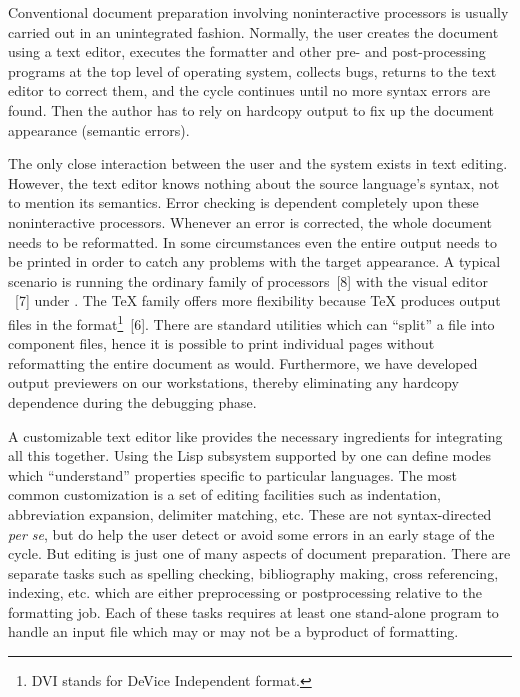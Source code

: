 Conventional document preparation involving noninteractive processors
is usually carried out in an unintegrated fashion.  Normally, the user
creates the document using a text editor, executes the formatter and
other pre- and post-processing programs at the top level of operating system,
collects bugs, returns to the text editor to correct them,
and the cycle continues until no more syntax errors are found.
Then the author has to rely on hardcopy output to fix up the 
document appearance (semantic errors).

The only close interaction between the user and the system exists in
text editing.  However, the text editor knows nothing about the source language's
syntax, not to mention its semantics.  Error checking is dependent completely
upon these noninteractive processors.  Whenever an error is corrected,
the whole document needs to be reformatted.  In some circumstances even 
the entire output needs to be printed in order to catch any problems with the
target appearance.  A typical scenario is running the ordinary {\troff}
family of processors~[8] with the visual editor {\vi}~[7] under {\unix}.
The {\TeX} family offers more flexibility because {\TeX} produces output
files in the {\dvi} format\footnote{DVI stands for
DeVice Independent format.}~[6].
There are standard utilities which can ``split'' a {\dvi} file into component
files, hence it is possible to print individual pages without reformatting
the entire document as {\troff} would.
Furthermore, we have developed
output previewers on our workstations, thereby eliminating any hardcopy
dependence during the debugging phase.

A customizable text editor like {\emacs} provides the necessary
ingredients for integrating all this together.  Using the Lisp subsystem
supported by {\emacs} one can
define modes which ``understand'' properties specific to particular languages. 
The most common customization is a set of editing facilities such as
indentation, abbreviation expansion, delimiter matching, etc.
These are not syntax-directed {\it per se\/}, but do help the user detect 
or avoid some errors in an early stage of the cycle.
But editing is just one of many
aspects of document preparation.  There are separate tasks such as
spelling checking, bibliography making, cross referencing, indexing,
etc. which are either preprocessing or postprocessing relative to the
formatting job.  Each of these tasks requires at least one stand-alone
program to handle an input file which may or may not be a byproduct of
formatting.

